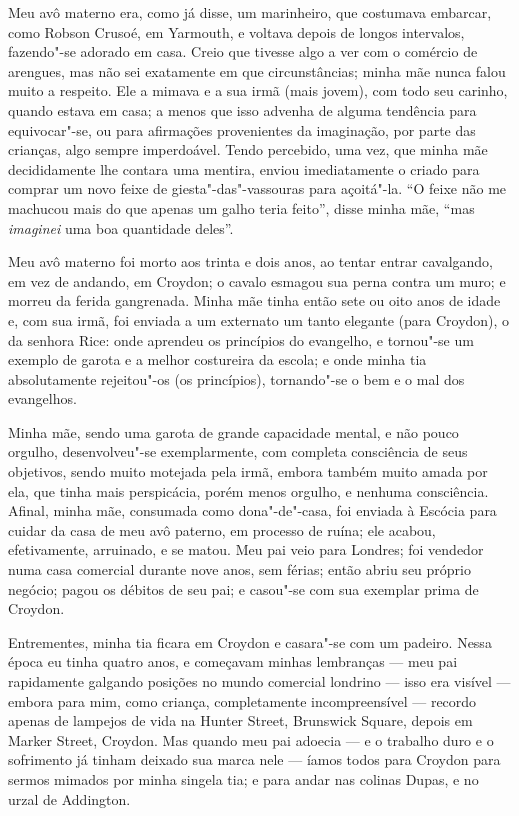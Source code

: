 {{{{{{{{{{Meu avô materno era, como já disse, um marinheiro, que costumava
embarcar, como Robson Crusoé, em Yarmouth, e voltava depois de longos
intervalos, fazendo"-se adorado em casa. Creio que tivesse algo a ver com
o comércio de arengues, mas não sei exatamente em que circunstâncias;
minha mãe nunca falou muito a respeito. Ele a mimava e a sua irmã (mais
jovem), com todo seu carinho, quando estava em casa; a menos que isso
advenha de alguma tendência para equivocar"-se, ou para afirmações
provenientes da imaginação, por parte das crianças, algo sempre
imperdoável. Tendo percebido, uma vez, que minha mãe decididamente lhe
contara uma mentira, enviou imediatamente o criado para comprar um novo
feixe de giesta"-das"-vassouras para açoitá"-la. ``O feixe não me machucou
mais do que apenas um galho teria feito'', disse minha mãe, ``mas
\textit{imaginei} uma boa quantidade deles''.

Meu avô materno foi morto aos trinta e dois anos, ao tentar entrar
cavalgando, em vez de andando, em Croydon; o cavalo esmagou sua perna
contra um muro; e morreu da ferida gangrenada. Minha mãe tinha então
sete ou oito anos de idade e, com sua irmã, foi enviada a um externato
um tanto elegante (para Croydon), o da senhora Rice: onde aprendeu os
princípios do evangelho, e tornou"-se um exemplo de garota e a melhor
costureira da escola; e onde minha tia absolutamente rejeitou"-os (os
princípios), tornando"-se o bem e o mal dos evangelhos.

Minha mãe, sendo uma garota de grande capacidade mental, e não pouco
orgulho, desenvolveu"-se exemplarmente, com completa consciência de seus
objetivos, sendo muito motejada pela irmã, embora também muito amada por
ela, que tinha mais perspicácia, porém menos orgulho, e nenhuma
consciência. Afinal, minha mãe, consumada como dona"-de"-casa, foi enviada
à Escócia para cuidar da casa de meu avô paterno, em processo de ruína;
ele acabou, efetivamente, arruinado, e se matou. Meu pai veio para
Londres; foi vendedor numa casa comercial durante nove anos, sem férias;
então abriu seu próprio negócio; pagou os débitos de seu pai; e casou"-se
com sua exemplar prima de Croydon.

Entrementes, minha tia ficara em Croydon e casara"-se com um padeiro.
Nessa época eu tinha quatro anos, e começavam minhas lembranças --- meu
pai rapidamente galgando posições no mundo comercial londrino --- isso
era visível --- embora para mim, como criança, completamente
incompreensível --- recordo apenas de lampejos de vida na Hunter Street,
Brunswick Square, depois em Marker Street, Croydon. Mas quando meu pai
adoecia --- e o trabalho duro e o sofrimento já tinham deixado sua marca
nele --- íamos todos para Croydon para sermos mimados por minha singela
tia; e para andar nas colinas Dupas, e no urzal de Addington.

}}}}}}}}}}
